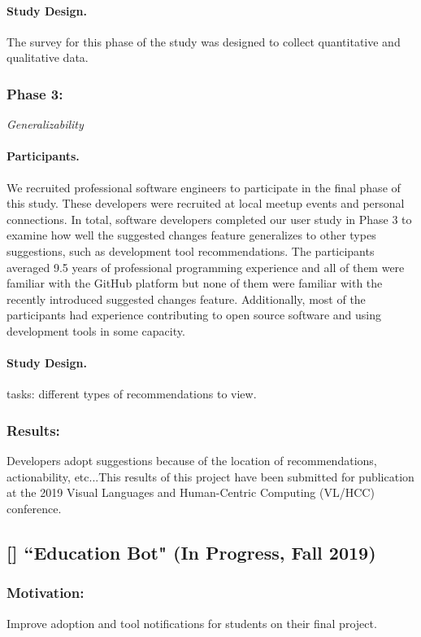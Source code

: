 \paragraph{Study Design.} The survey for this phase of the study was designed to collect quantitative and qualitative data. \\

\subsubsection{Phase 3:} \textit{Generalizability}

\paragraph{Participants.} We recruited professional software engineers to participate in the final phase of this study. These developers were recruited at local meetup events and personal connections. In total,  software developers completed our user study in Phase 3 to examine how well the suggested changes feature generalizes to other types suggestions, such as development tool recommendations. The participants averaged 9.5 years of professional programming experience and all of them were familiar with the GitHub platform but none of them were familiar with the recently introduced suggested changes feature. Additionally, most of the participants had experience contributing to open source software and using development tools in some capacity.

\paragraph{Study Design.} tasks: different types of recommendations to view.

\subsubsection{Results:} Developers adopt suggestions because of the location of recommendations, actionability, etc...This results of this project have been submitted for publication at the 2019 Visual Languages and Human-Centric Computing (VL/HCC) conference.

\subsection{[\proc] ``Education Bot" (In Progress, Fall 2019)}

\subsubsection{Motivation:} Improve adoption and tool notifications for students on their final project.

